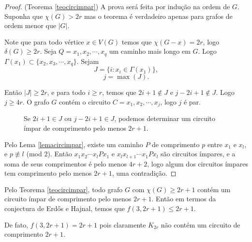 \begin{proof}(Teorema \ref{teocircimpar})
A prova será feita por indução na ordem de $G$. Suponha que $\chi(G) > 2r$ mas o teorema é verdadeiro apenas para grafos de ordem menor que $|G|$.

Note que para todo vértice $x\in V(G)$ temos que $\chi(G - x) = 2r$, logo $\delta(G) \geq 2r$. Seja $Q = x_1,x_2,\cdots,x_q$ um caminho mais longo em $G$. Logo $\Gamma(x_1) \subset \{x_2,x_3,\cdots, x_q\}$. Sejam
\[J = \{i : x_i \in \Gamma(x_1)\},\]
\[j = \max(J).\]

Então $|J| \geq 2r$, e para todo $i\geq r$, temos que $2i+1\not\in J$ e $j-2i+1\not\in J$. Logo $j\geq 4r$. O grafo $G$ contém o circuito $C=x_1,x_2,\cdots,x_j$, logo $j$ é par.

\begin{figure}[H]
\centering
{}
\caption{Se $2i+1\in J$ ou $j-2i+1\in J$, podemos determinar um circuito ímpar de comprimento pelo menos $2r+1$.}
\label{fig:circimpar-j2r}
\end{figure}

Pelo Lema \ref{lemacircimpar}, existe um caminho $P$ de comprimento $p$ entre $x_1$ e $x_l$, e $p \not\equiv l$ (mod $2$). Então $x_1 x_2 \cdots x_l P x_1$ e $x_l x_{l+1} \cdots x_1 P x_l$ são circuitos ímpares, e a soma de seus comprimentos é pelo menos $4r+2$, logo algum dos circuitos ímpares tem comprimento pelo menos $2r+1$, uma contradição.
\end{proof}

Pelo Teorema \ref{teocircimpar}, todo grafo $G$ com $\chi(G) \geq 2r+1$ contém um circuito ímpar de comprimento pelo menos $2r+1$. Então em termos da conjectura de Erd\H{o}s e Hajnal, temos que $f(3,2r+1) \leq 2r+1$.

De fato, $f(3,2r+1) = 2r+1$ pois claramente $K_{2r}$ não contém um circuito de comprimento $2r+1$.